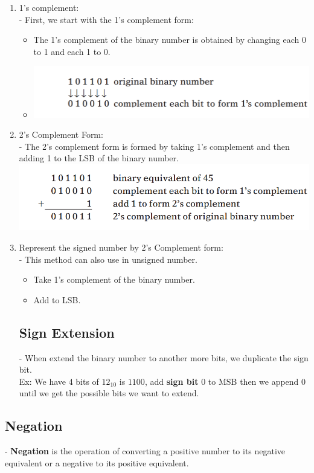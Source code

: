 \documentclass[12pt]{article}
\begin{document}
\begin{enumerate}
	\item 1's complement: \\
	- First, we start with the 1's complement form: \\
	\begin{itemize}
		\item The 1's complement of the binary number is obtained by changing each 0 to 1 and each 1 to 0.
		\item \includegraphics[scale = 0.6]{hinh22}
	\end{itemize}
	\item 2's Complement Form: \\
	- The 2's complement form is formed by taking 1's complement and then adding 1 to the LSB of the binary number. \\
	\includegraphics[scale = 0.6]{hinh23}
	\bigbreak
	\item Represent the signed number by 2's Complement form: \\
	- This method can also use in unsigned number.
	\begin{itemize}
		\item Take 1's complement of the binary number.
		\item Add to LSB.
	\end{itemize}
\subsection{Sign Extension}
- When extend the binary number to another more bits, we duplicate the sign bit. \\
	Ex: We have 4 bits of $12_{10}$ is $1100$, add \textbf{sign bit} 0 to MSB then we append 0 until we get the possible bits we want to extend.
\end{enumerate}
\subsection{Negation}
- \textbf{Negation} is the operation of converting a positive number to its negative equivalent or a negative to its positive equivalent.
\end{document}
